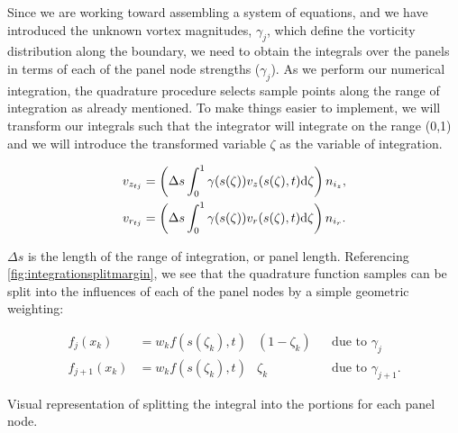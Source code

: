 Since we are working toward assembling a system of equations, and we have introduced the unknown vortex magnitudes, \(\gamma_j\), which define the vorticity distribution along the boundary, we need to obtain the integrals over the panels in terms of each of the panel node strengths (\(\gamma_j\)).
%
As we perform our numerical integration, the quadrature procedure selects sample points along the range of integration as already mentioned.
%
To make things easier to implement, we will transform our integrals such that the integrator will integrate on the range (0,1) and we will introduce the transformed variable \(\zeta\) as the variable of integration.

\begin{subequations}
    \begin{align}
        v_{z_{tj}} &=\left(\Delta s \int_{0}^{1}\gamma(s(\zeta)) v_z(s(\zeta),t) \mathrm{d} \zeta \right)n_{i_z},\\
        v_{r_{tj}} &=\left(\Delta s \int_{0}^{1}\gamma(s(\zeta)) v_r(s(\zeta),t) \mathrm{d} \zeta \right)n_{i_r}.
    \end{align}
\end{subequations}

\where \(\Delta s\) is the length of the range of integration, or panel length.
%
Referencing \cref{fig:integrationsplitmargin}, we see that the quadrature function samples can be split into the influences of each of the panel nodes by a simple geometric weighting:

\begin{subequations}
    \label{eqn:integrationpieces}
    \begin{align}
        f_j(x_k) &= w_k f(s(\zeta_k),t)&(1-\zeta_k) && \text{due to } \gamma_j \\
        f_{j+1}(x_k) &= w_k f(s(\zeta_k),t)&\zeta_k && \text{due to } \gamma_{j+1}.
    \end{align}
\end{subequations}

\begin{marginfigure}
	
	\caption{Visual representation of splitting the integral into the portions for each panel node.}
	\label{fig:integrationsplitmargin}
\end{marginfigure}

